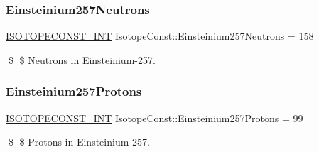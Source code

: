 \subsubsection{\texorpdfstring{Einsteinium257\+Neutrons}{Einsteinium257Neutrons}}
{\footnotesize\ttfamily \mbox{\hyperlink{group___isotope_const-_macros_ga5f18360b3e99483a35c32d789e62621c}{I\+S\+O\+T\+O\+P\+E\+C\+O\+N\+S\+T\+\_\+\+I\+NT}} Isotope\+Const\+::\+Einsteinium257\+Neutrons = 158}

\$ \$ Neutrons in Einsteinium-\/257. \mbox{\label{group___isotope_const-_einsteinium-_es257_ga478ed081f8b209d69afc82ec2172955f}} 
\subsubsection{\texorpdfstring{Einsteinium257\+Protons}{Einsteinium257Protons}}
{\footnotesize\ttfamily \mbox{\hyperlink{group___isotope_const-_macros_ga5f18360b3e99483a35c32d789e62621c}{I\+S\+O\+T\+O\+P\+E\+C\+O\+N\+S\+T\+\_\+\+I\+NT}} Isotope\+Const\+::\+Einsteinium257\+Protons = 99}

\$ \$ Protons in Einsteinium-\/257. 
